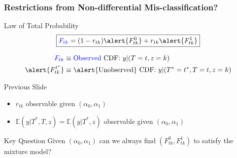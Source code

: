 \documentclass[handout]{beamer}
\begin{document}
\begin{frame}
  \frametitle{Restrictions from Non-differential Mis-classification?}

  \begin{block}{Law of Total Probability}
    \vspace{-1.5em}
  \[
    \boxed{\textcolor{blue}{F_{tk}} = (1 - r_{tk}) \alert{F^{0}_{tk}} + r_{tk}\alert{F^{1}_{tk}}}
  \]
  \scriptsize

  \vspace{-1em}
    \begin{align*}
    \textcolor{blue}{F_{tk}} &\equiv \mbox{\textcolor{blue}{Observed} CDF: } y|(T=t,z=k) \\
    \alert{F^{t^*}_{tk}} &\equiv \mbox{\alert{Unobserved} CDF: } y|(T^*=t^*,T=t,z=k)
    \end{align*}
  \end{block}

  \begin{block}{Previous Slide}
    \begin{itemize} 
    \small
      \item $r_{tk}$ observable given $(\alpha_0, \alpha_1)$
      \item $\mathbb{E}(y|T^*,T,z) = \mathbb{E}(y|T^*,z)$ observable given $(\alpha_0, \alpha_1)$
    \end{itemize}
    
  \end{block}

  \begin{alertblock}{Key Question}
    \small
  Given $(\alpha_0, \alpha_1)$ can we always find $(F_{tk}^0, F_{tk}^1)$ to satisfy the mixture model? 
  \end{alertblock}
    



\end{frame}
\end{document}
